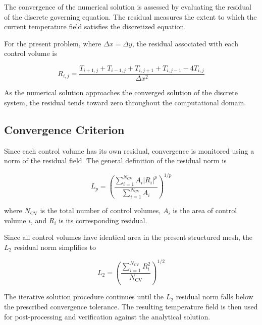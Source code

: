 The convergence of the numerical solution is assessed by evaluating the residual of the discrete governing equation. The residual measures the extent to which the current temperature field satisfies the discretized equation.

For the present problem, where $\Delta x=\Delta y$, the residual associated with each control volume is

\begin{equation}
R_{i,j}
=
\frac{
T_{i+1,j}
+
T_{i-1,j}
+
T_{i,j+1}
+
T_{i,j-1}
-
4T_{i,j}
}
{\Delta x^2}
\label{eq:residual}
\end{equation}

As the numerical solution approaches the converged solution of the discrete system, the residual tends toward zero throughout the computational domain.


\subsection{Convergence Criterion}

Since each control volume has its own residual, convergence is monitored using a norm of the residual field. The general definition of the residual norm is

\begin{equation}
L_p
=
\left(
\frac{
\sum_{i=1}^{N_{\mathrm{CV}}}
A_i |R_i|^p
}{
\sum_{i=1}^{N_{\mathrm{CV}}} A_i
}
\right)^{1/p}
\label{eq:lp}
\end{equation}

where $N_{\mathrm{CV}}$ is the total number of control volumes, $A_i$ is the area of control volume $i$, and $R_i$ is its corresponding residual.

Since all control volumes have identical area in the present structured mesh, the $L_2$ residual norm simplifies to

\begin{equation}
L_2
=
\left(
\frac{
\sum_{i=1}^{N_{\mathrm{CV}}} R_i^2
}{
N_{\mathrm{CV}}
}
\right)^{1/2}
\label{eq:l2}
\end{equation}

The iterative solution procedure continues until the $L_2$ residual norm falls below the prescribed convergence tolerance. The resulting temperature field is then used for post-processing and verification against the analytical solution.


